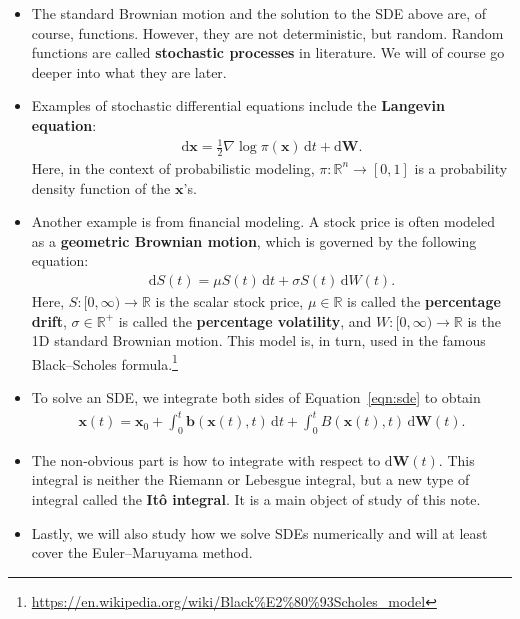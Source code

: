 \documentclass[10pt]{article}
\newcommand{\dee}{\mathrm{d}}
\newcommand{\ve}[1]{\mathbf{#1}}
\newcommand{\Real}{\mathbb{R}}
\begin{document}
\begin{itemize}
  \item The standard Brownian motion and the solution to the SDE above are, of course, functions. However, they are not deterministic, but random. Random functions are called {\bf stochastic processes} in literature. We will of course go deeper into what they are later.

  \item Examples of stochastic differential equations include the {\bf Langevin equation}:
  \begin{align*}
    \dee\ve{x} = \frac{1}{2} \nabla \log \pi(\ve{x})\, \dee t + \dee\ve{W}.
  \end{align*}
  Here, in the context of probabilistic modeling, $\pi: \Real^n \rightarrow [0,1]$ is a probability density function of the $\ve{x}$'s.

  \item Another example is from financial modeling. A stock price is often modeled as a {\bf geometric Brownian motion}, which is governed by the following equation:
  \begin{align*}
    \dee S(t) = \mu S(t)\, \dee t + \sigma S(t)\, \dee W(t).
  \end{align*}
  Here, $S: [0,\infty) \rightarrow \Real$ is the scalar stock price, $\mu \in \Real$ is called the {\bf percentage drift}, $\sigma \in \Real^+$ is called the {\bf percentage volatility}, and $W: [0,\infty) \rightarrow \Real$ is the 1D standard Brownian motion. This model is, in turn, used in the famous Black--Scholes formula.\footnote{\url{https://en.wikipedia.org/wiki/Black\%E2\%80\%93Scholes_model}}

  \item To solve an SDE, we integrate both sides of Equation~\ref{eqn:sde} to obtain
  \begin{align*}
    \ve{x}(t) = \ve{x}_0 + \int_0^t \ve{b}(\ve{x}(t), t)\, \dee t + \int_0^t B(\ve{x}(t), t)\, \dee\ve{W}(t).
  \end{align*}
  
  \item The non-obvious part is how to integrate with respect to $\dee\ve{W}(t)$. This integral is neither the Riemann or Lebesgue integral, but a new type of integral called the {\bf It\^{o} integral}. It is a main object of study of this note.
  
  \item Lastly, we will also study how we solve SDEs numerically and will at least cover the Euler--Maruyama method.
\end{itemize}
\end{document}
